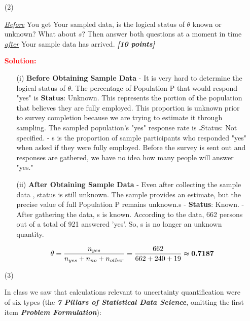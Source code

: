 \documentclass[12pt]{article}
\newcommand{\bi}[1]{\b{\i{#1}}}
\renewcommand{\b}[1]{\textbf{#1}}
\renewcommand{\i}[1]{\textit{#1}}
\renewcommand{\u}[1]{\underline{#1}}
\begin{document}
\newenvironment{Solution2}[1]{%
    \leavevmode\color{#1}\ignorespaces%
}{%
}%

\begin{itemize}

\item[(2)]

\i{\u{Before}} You get Your sampled data, is the logical status of $\theta$ known or unknown? What about $s$? Then answer both questions at a moment in time \i{\u{after}} Your sample data has arrived. \bi{[10 points]}


\textbf{\textcolor{red}{Solution:}} \\
\begin{Solution2}{blue}
\begin{itemize}
    \item [(i)]
        \textbf{Before Obtaining Sample Data} - It is very hard to determine the logical status of \textbf{$\theta$}. The percentage of Population P that would respond "yes" is \textbf{Status}: Unknown. This represents the portion of the population that believes they are fully employed. This proportion is unknown prior to survey completion because we are trying to estimate it through sampling. 
        The sampled population's "yes" response rate is \textbf.{Status}: Not specified. - s is the proportion of sample participants who responded "yes" when asked if they were fully employed. Before the survey is sent out and responses are gathered, we have no idea how many people will answer "yes."
    \item [(ii)] 
        \textbf{After Obtaining Sample Data} - Even after collecting the sample data , status is still unknown. The sample provides an estimate, but the precise value of full Population P remains unknown.s - \textbf{Status}: Known. - After gathering the data, s is known. According to the data, 662 persons out of a total of 921 answered ’yes’. So, s is no longer an unknown quantity.

\[\textbf{$\theta$}=\frac{n_{yes}}{n_{yes} + n_{no} + n_{other}} = \frac{662}{662 + 240 + 19 } \thickapprox \textbf{0.7187} \]



\end{itemize}
\end{Solution2}

\vspace*{0.5in}

\item[(3)]

In class we saw that calculations relevant to uncertainty quantification were of six types (the \bi{7 Pillars of Statistical Data Science}, omitting the first item \bi{Problem Formulation}): 


\end{itemize}
\end{document}
